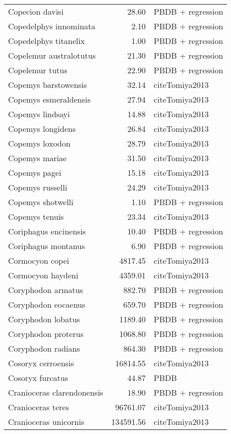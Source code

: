 \begin{table}[ht]
\begin{tabular}{lrl}
  Copecion davisi & 28.60 & PBDB + regression \\ 
  Copedelphys innominata & 2.10 & PBDB + regression \\ 
  Copedelphys titanelix & 1.00 & PBDB + regression \\ 
  Copelemur australotutus & 21.30 & PBDB + regression \\ 
  Copelemur tutus & 22.90 & PBDB + regression \\ 
  Copemys barstowensis & 32.14 & cite{Tomiya2013} \\ 
  Copemys esmeraldensis & 27.94 & cite{Tomiya2013} \\ 
  Copemys lindsayi & 14.88 & cite{Tomiya2013} \\ 
  Copemys longidens & 26.84 & cite{Tomiya2013} \\ 
  Copemys loxodon & 28.79 & cite{Tomiya2013} \\ 
  Copemys mariae & 31.50 & cite{Tomiya2013} \\ 
  Copemys pagei & 15.18 & cite{Tomiya2013} \\ 
  Copemys russelli & 24.29 & cite{Tomiya2013} \\ 
  Copemys shotwelli & 1.10 & PBDB + regression \\ 
  Copemys tenuis & 23.34 & cite{Tomiya2013} \\ 
  Coriphagus encinensis & 10.40 & PBDB + regression \\ 
  Coriphagus montanus & 6.90 & PBDB + regression \\ 
  Cormocyon copei & 4817.45 & cite{Tomiya2013} \\ 
  Cormocyon haydeni & 4359.01 & cite{Tomiya2013} \\ 
  Coryphodon armatus & 882.70 & PBDB + regression \\ 
  Coryphodon eocaenus & 659.70 & PBDB + regression \\ 
  Coryphodon lobatus & 1189.40 & PBDB + regression \\ 
  Coryphodon proterus & 1068.80 & PBDB + regression \\ 
  Coryphodon radians & 864.30 & PBDB + regression \\ 
  Cosoryx cerroensis & 16814.55 & cite{Tomiya2013} \\ 
  Cosoryx furcatus & 44.87 & PBDB \\ 
  Cranioceras clarendonensis & 18.90 & PBDB + regression \\ 
  Cranioceras teres & 96761.07 & cite{Tomiya2013} \\ 
  Cranioceras unicornis & 134591.56 & cite{Tomiya2013} \\ 

\end{tabular}
\end{table}
